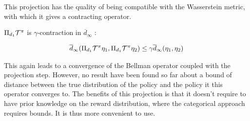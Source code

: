 This projection has the quality of being compatible with the Wasserstein metric, with which it gives a contracting operator.

\begin{proposition}
    $\Pi_{d_1}\mathcal{T}^\pi$ is $\gamma$-contraction in $\overline{d}_\infty$ :

    \[ \overline{d}_\infty(\Pi_{d_1}\mathcal{T}^\pi\eta_1 , \Pi_{d_1}\mathcal{T}^\pi\eta_2) \leq \gamma \overline{d}_\infty(\eta_1, \eta_2)\]
\end{proposition}

This again leads to a convergence of the Bellman operator coupled with the projection step. However, no result have been found so far about a bound of distance between the true distribution of the policy and the policy it this operator converges to. The benefits of this projection is that it doesn’t require to have prior knowledge on the reward distribution, where the categorical approach requires bounds. It is thus more convenient to use.












